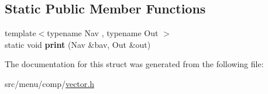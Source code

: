 \subsection*{Static Public Member Functions}
\begin{DoxyCompactItemize}
\item 
\mbox{\label{structVectorMenu_a6afd504bebb9fc0196133d541f2c0192}} 
{\footnotesize template$<$typename Nav , typename Out $>$ }\\static void {\bfseries print} (Nav \&bav, Out \&out)
\end{DoxyCompactItemize}


The documentation for this struct was generated from the following file\+:\begin{DoxyCompactItemize}
\item 
src/menu/comp/\hyperlink{vector_8h}{vector.\+h}\end{DoxyCompactItemize}
